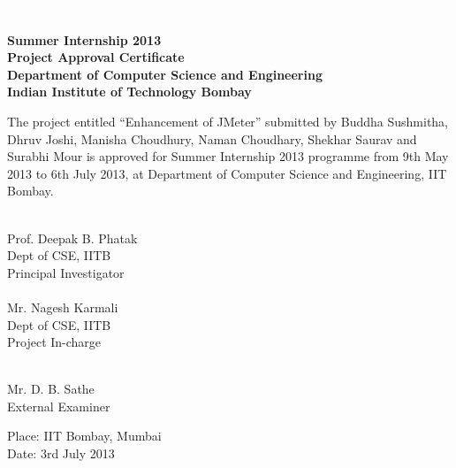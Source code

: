 \documentclass[12pt]{book}
\begin{document}
 \pagebreak \textcolor{white}{text} \pagebreak
\thispagestyle{empty}

\begin{center}
\thispagestyle{empty}
\LARGE
\textbf{Summer Internship 2013 \\ Project Approval Certificate} \\
\vskip12pt
\Large
\textbf{Department of Computer Science and Engineering} \\
\vskip5pt
\textbf{Indian Institute of Technology Bombay} \\
\end{center}
\vfill
\normalsize
The project entitled ``Enhancement of JMeter'' submitted by Buddha Sushmitha,  Dhruv Joshi, Manisha Choudhury, Naman Choudhary, Shekhar Saurav and Surabhi Mour is approved for Summer Internship 2013 programme from 9th May 2013 to 6th July 2013, at Department of Computer Science and Engineering, IIT Bombay.

\vfill

\begin{multicols}{2}
\underline{\hspace{5cm}} \\
\indent Prof. Deepak B. Phatak \\
\indent Dept of CSE, IITB \\
\indent Principal Investigator \\

\flushright
\underline{\hspace{5cm}} \\
 Mr. Nagesh Karmali \\
\indent Dept of CSE, IITB \\
\indent Project In-charge \\
\end{multicols}

\vfill

\begin{center}
\underline{\hspace{5cm}} \\
 Mr. D. B. Sathe \\
 External Examiner \\
\end{center}
 
 \begin{flushleft}
 
 \vfill
 Place: IIT Bombay, Mumbai \\
 Date: 3rd July 2013 
 \end{flushleft}
 
\end{document}
